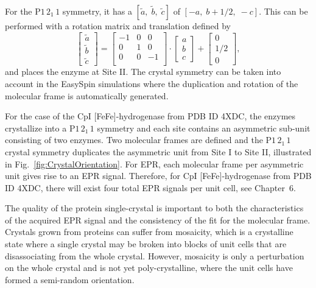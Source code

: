 For the P$1\,2_1\,1$ symmetry, it has a $[\tilde{a},\;\tilde{b},\;\tilde{c}]$ of $[-a,\;b+1/2,\;-c]$. This can be performed with a rotation matrix and translation defined by 
\begin{equation}
     \begin{bmatrix}
  \tilde{a} \\
  \tilde{b} \\
  \tilde{c} 
  \end{bmatrix} = \begin{bmatrix}
   -1 & 0 & 0\\
    0 & 1 & 0\\
    0 &  0 & -1\\
   \end{bmatrix} \cdot      \begin{bmatrix}
  a \\
  b \\
  c 
  \end{bmatrix} + \begin{bmatrix}
  0 \\
  1/2 \\
  0 
  \end{bmatrix},
\end{equation}
and places the enzyme at Site II. The crystal symmetry can be taken into account in the EasySpin simulations where the duplication and rotation of the molecular frame is automatically generated. 

For the case of the CpI [FeFe]-hydrogenase from PDB ID 4XDC,\cite{FeFeCry} the enzymes crystallize into a P$1\,2_1\,1$ symmetry and each site contains an asymmetric sub-unit consisting of two enzymes. Two molecular frames are defined and the P$1\,2_1\,1$ crystal symmetry duplicates the asymmetric unit from Site I to Site II, illustrated in Fig.~\ref{fig:CrystalOrientation}. For EPR, each molecular frame per asymmetric unit gives rise to an EPR signal. Therefore, for CpI [FeFe]-hydrogenase from PDB ID 4XDC, there will exist four total EPR signals per unit cell, see Chapter~6.

The quality of the protein single-crystal is important to both the characteristics of the acquired EPR signal and the consistency of the fit for the molecular frame. Crystals grown from proteins can suffer from mosaicity, which is a crystalline state where a single crystal may be broken into blocks of unit cells that are disassociating from the whole crystal. However, mosaicity is only a perturbation on the whole crystal and is not yet poly-crystalline, where the unit cells have formed a semi-random orientation. 


